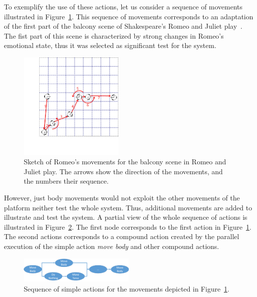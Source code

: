 To exemplify the use of these actions, let us consider a sequence of movements illustrated in Figure~\ref{fig:triskar_test}. This sequence of movements corresponds to an adaptation of the first part of the balcony scene of Shakespeare's Romeo and Juliet play~\cite{RAndJ}. The fist part of this scene is characterized by strong changes in Romeo's emotional state, thus it was selected as significant test for the system.  
\begin{figure}
	\centering
	\includegraphics[width=0.45\textwidth]{./Images/FourthCaseSceneB.png}
	\caption{Sketch of Romeo's movements for the balcony scene in Romeo and Juliet play. The arrows show the direction of the movements, and the numbers their sequence.}
	\label{fig:triskar_test}
\end{figure} 
However, just body movements would not exploit the other movements of the platform neither test the whole system. Thus, additional movements are added to illustrate and test the system. A partial view of the whole sequence of actions is illustrated in Figure~\ref{fig:sequence_actions}. The first node corresponds to the first action in Figure~\ref{fig:triskar_test}. The second actions corresponds to a compound action created by the parallel execution of the simple action \textit{move body} and other compound actions.

\begin{figure}
	\centering
	\includegraphics[width=0.5\textwidth]{./Images/sequenceActions.png}
	\caption{Sequence of simple actions for the movements depicted in Figure~\ref{fig:triskar_test}.}
	\label{fig:sequence_actions}
\end{figure}

